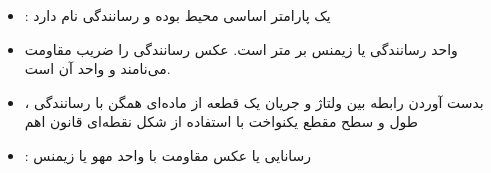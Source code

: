 \begin{ELunit}

\begin{itemize}
\item
  : یک پارامتر اساسی محیط بوده و رسانندگی نام دارد
\item
  واحد رسانندگی  یا زیمنس بر متر است. عکس رسانندگی را ضریب مقاومت می‌نامند و واحد آن  است.
\item
  بدست آوردن رابطه بین ولتاژ و جریان یک قطعه از ماده‌ای همگن با رسانندگی \ELim{\sigma}، طول \ELim{\ell} و سطح مقطع یکنواخت  با استفاده از شکل نقطه‌ای قانون اهم
\end{itemize}



\end{ELunit}

\begin{ELimportant}{}


\end{ELimportant}

\begin{ELunit}

\begin{itemize}
\tightlist
\item
  : رسانایی یا عکس مقاومت با واحد مهو یا زیمنس
\end{itemize}

\end{ELunit}

\ELhold


